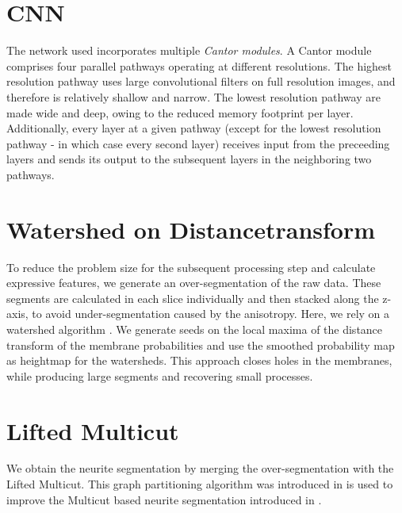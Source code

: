 \documentclass[runningheads,a4paper]{llncs}
\begin{document}
\section{CNN}\label{sec:cnn}

The network used incorporates multiple \emph{Cantor modules}. A Cantor module comprises four parallel pathways operating at different resolutions. The highest resolution pathway uses large convolutional filters on full resolution images, and therefore is relatively shallow and narrow. The lowest resolution pathway are made wide and deep, owing to the reduced memory footprint per layer. Additionally, every layer at a given pathway (except for the lowest resolution pathway - in which case every second layer) receives input from the preceeding layers and sends its output to the subsequent layers in the neighboring two pathways. 


\section{Watershed on Distancetransform}\label{sec:wsdt}

To reduce the problem size for the subsequent processing step and calculate expressive features, we generate an over-segmentation of the raw data.
These segments are calculated in each slice individually and then stacked along the z-axis, to avoid under-segmentation caused by the anisotropy.
Here, we rely on a watershed algorithm \cite{couprie1997topological}.
We generate seeds on the local maxima of the distance transform of the membrane probabilities and 
use the smoothed probability map as heightmap for the watersheds.
This approach closes holes in the membranes, while producing large segments and recovering small processes.


\section{Lifted Multicut}\label{sec:lmc}

We obtain the neurite segmentation by merging the over-segmentation with the Lifted Multicut.
This graph partitioning algorithm was introduced in \cite{andres2015lifting} is used to improve the Multicut based neurite segmentation introduced in \cite{andres2012globally}.
\end{document}
